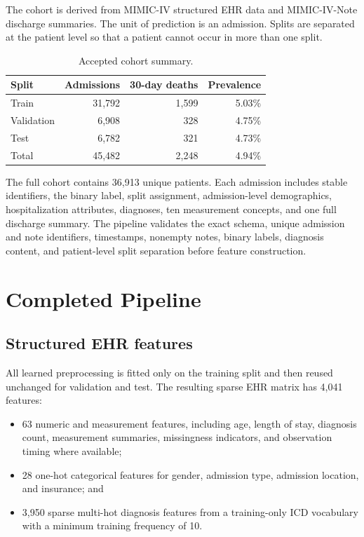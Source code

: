 \documentclass[11pt]{article}
\begin{document}
The cohort is derived from MIMIC-IV structured EHR data and MIMIC-IV-Note
discharge summaries. The unit of prediction is an admission. Splits are separated
at the patient level so that a patient cannot occur in more than one split.

\begin{table}[ht]
\centering
\caption{Accepted cohort summary.}
\label{tab:cohort}
\begin{tabular}{lrrr}
\toprule
\rowcolor{lightblue}
Split & Admissions & 30-day deaths & Prevalence \\
\midrule
Train      & 31,792 & 1,599 & 5.03\% \\
Validation &  6,908 &   328 & 4.75\% \\
Test       &  6,782 &   321 & 4.73\% \\
\midrule
Total      & 45,482 & 2,248 & 4.94\% \\
\bottomrule
\end{tabular}
\end{table}

The full cohort contains 36,913 unique patients. Each admission includes stable
identifiers, the binary label, split assignment, admission-level demographics,
hospitalization attributes, diagnoses, ten measurement concepts, and one full
discharge summary. The pipeline validates the exact schema, unique admission and
note identifiers, timestamps, nonempty notes, binary labels, diagnosis content,
and patient-level split separation before feature construction.

\section{Completed Pipeline}

\subsection{Structured EHR features}

All learned preprocessing is fitted only on the training split and then reused
unchanged for validation and test. The resulting sparse EHR matrix has 4,041
features:

\begin{itemize}
  \item 63 numeric and measurement features, including age, length of stay,
        diagnosis count, measurement summaries, missingness indicators, and
        observation timing where available;
  \item 28 one-hot categorical features for gender, admission type, admission
        location, and insurance; and
  \item 3,950 sparse multi-hot diagnosis features from a training-only ICD
        vocabulary with a minimum training frequency of 10.
\end{itemize}
\end{document}

